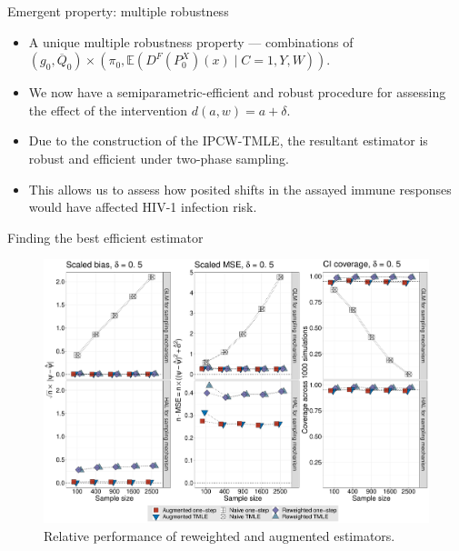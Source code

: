 \documentclass{beamer}
\newcommand{\E}{\mathbb{E}}
\begin{document}

\begin{frame}[c]{Emergent property: multiple robustness}

\begin{center}
\begin{itemize}
  \itemsep10pt
  \item A unique multiple robustness property --- combinations of
    $(g_0, \overline{Q}_0) \times (\pi_0, \E(D^F(P^X_0)(x) \mid C = 1, Y, W))$.
  \item We now have a semiparametric-efficient and robust procedure for
    assessing the effect of the intervention $d(a,w) = a + \delta$.
  \item Due to the construction of the IPCW-TMLE, the resultant estimator is
    robust and efficient under two-phase sampling.
  \item This allows us to assess how posited shifts in the assayed immune
    responses would have affected HIV-1 infection risk.
\end{itemize}
\end{center}

\note{
}

\end{frame}


\begin{frame}[c]{Finding the best efficient estimator}

\vspace{-1.5em}
\begin{figure}[H]
  \centering
  \includegraphics[scale=0.23]{simple_effect_panel_delta_upshift}
  \vspace{-0.5em}
  \caption{
    Relative performance of reweighted and augmented estimators.
  }
\end{figure}

\note{
}

\end{frame}
\end{document}
